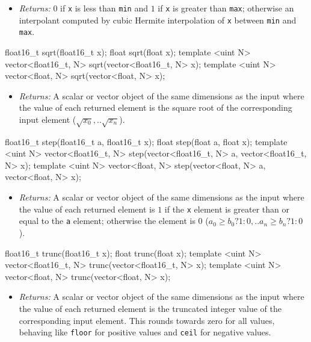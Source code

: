 \begin{itemize}
  \item \textit{Returns:} $0$ if \texttt{x} is less than \texttt{min} and $1$ if
  \texttt{x} is greater than \texttt{max}; otherwise an interpolant computed by
  cubic Hermite interpolation of \texttt{x} between \texttt{min} and \texttt{max}.
\end{itemize}

\begin{HLSL}
float16_t sqrt(float16_t x);
float sqrt(float x);
template <uint N> vector<float16_t, N> sqrt(vector<float16_t, N> x);
template <uint N> vector<float, N> sqrt(vector<float, N> x);
\end{HLSL}

\begin{itemize}
  \item \textit{Returns:} A scalar or vector object of the same dimensions as
  the input where the value of each returned element is the square root of the
  corresponding input element (\(\sqrt{x_0}, .. \sqrt{x_n}\)).
\end{itemize}

\begin{HLSL}
float16_t step(float16_t a, float16_t x);
float step(float a, float x);
template <uint N>
vector<float16_t, N> step(vector<float16_t, N> a, vector<float16_t, N> x);
template <uint N> vector<float, N> step(vector<float, N> a, vector<float, N> x);
\end{HLSL}

\begin{itemize}

  \item \textit{Returns:} A scalar or vector object of the same dimensions as
  the input where the value of each returned element is $1$ if the \texttt{x}
  element is greater than or equal to the \texttt{a} element; otherwise the
  element is $0$ (\(a_0 \geq b_0 ? 1 : 0, .. a_n \geq b_n ? 1 : 0\)).
\end{itemize}

\begin{HLSL}
float16_t trunc(float16_t x);
float trunc(float x);
template <uint N> vector<float16_t, N> trunc(vector<float16_t, N> x);
template <uint N> vector<float, N> trunc(vector<float, N> x);
\end{HLSL}

\begin{itemize}
  \item \textit{Returns:} A scalar or vector object of the same dimensions as
  the input where the value of each returned element is the truncated integer
  value of the corresponding input element. This rounds towards zero for all
  values, behaving like \texttt{floor} for positive values and \texttt{ceil} for
  negative values.
\end{itemize}

